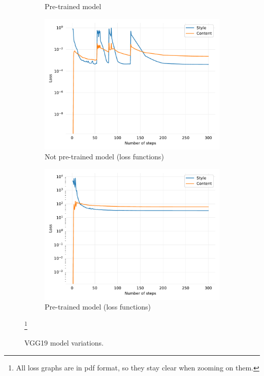 \documentclass[twocolumn,superscriptaddress,aps,floatfix,nofootinbib]{revtex4-1}
\begin{document}
\begin{figure}[ht]
\begin{subfigure}[b]{0.22\textwidth}
            \caption{Pre-trained model}
        \end{subfigure}
        \begin{subfigure}[b]{0.22\textwidth}
            \centering
            \includegraphics[width=\textwidth]{resources/pdf/model/sun-trees-paris-notpretrained.pdf}
            \caption{Not pre-trained model (loss functions)}
        \end{subfigure}
        \hfill
        \begin{subfigure}[b]{0.22\textwidth}
            \centering
            \includegraphics[width=\textwidth]{resources/pdf/model/sun-trees-paris-pretrained.pdf}
            \caption{Pre-trained model (loss functions)}
        \end{subfigure}
        \caption{VGG19 model variations.}\footnote{All loss graphs are in pdf format, so they stay clear when zooming on them.}
        \label{fig:model.pretrained.variations}
    \end{figure}
    
\end{document}
